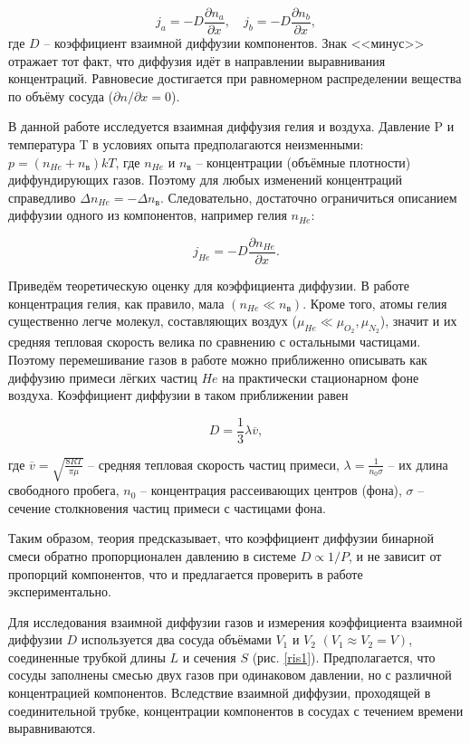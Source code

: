 \documentclass[a4paper, 12pt]{article}
\begin{document}
\[ j_a = -D\frac{\partial n_a}{\partial x}, \quad j_b = -D\frac{\partial n_b}{\partial x}, \]
где $ D $ -- коэффициент взаимной диффузии компонентов. Знак <<минус>> отражает тот факт, что диффузия идёт в направлении выравнивания концентраций. Равновесие достигается при равномерном распределении вещества по объёму сосуда ($ \partial n / \partial x = 0 $).

В данной работе исследуется взаимная диффузия гелия и воздуха. Давление P и температура T в условиях опыта предполагаются неизменными: $ p=(n_{He}+n_{\text{в}})kT $, где $ n_{He} $ и $ n_{\text{в}} $ -- концентрации (объёмные плотности) диффундирующих газов. Поэтому для любых изменений концентраций справедливо $ \Delta n_{He}=-\Delta n_{\text{в}} $. Следовательно, достаточно ограничиться описанием диффузии одного из компонентов, например гелия $ n_{He} $:

\begin{equation}\label{1}
j_{He}=-D\frac{\partial n_{He}}{\partial x}.
\end{equation}

Приведём теоретическую оценку для коэффициента диффузии. В работе концентрация гелия, как правило, мала $ (n_{He} \ll n_\text{в}) $. Кроме того, атомы гелия существенно легче молекул, составляющих воздух ($ \mu_{He} \ll \mu_{O_2}, \mu_{N_2} $), значит и их средняя тепловая скорость велика по сравнению с остальными частицами. Поэтому перемешивание газов в работе можно приближенно описывать как диффузию примеси лёгких частиц $ He $ на практически стационарном фоне воздуха. Коэффициент диффузии в таком приближении равен

\begin{equation}\label{2}
D=\frac{1}{3}\lambda \overline{v},
\end{equation}

где $ \overline{v}=\sqrt{\frac{8RT}{\pi \mu}} $ -- средняя тепловая скорость частиц примеси, $ \lambda = \frac{1}{n_0\sigma} $ -- их длина свободного пробега, $ n_0 $ -- концентрация рассеивающих центров (фона), $ \sigma $ -- сечение столкновения частиц примеси с частицами фона.

Таким образом, теория предсказывает, что коэффициент диффузии бинарной смеси обратно пропорционален давлению в системе $ D \propto 1/P $, и не зависит от пропорций компонентов, что и предлагается проверить в работе экспериментально.

Для исследования взаимной диффузии газов и измерения коэффициента взаимной диффузии $ D $ используется два сосуда объёмами $ V_1 $ и $ V_2 $ $ (V_1\approx V_2=V) $, соединенные трубкой длины $ L $ и сечения $ S $ (рис. \ref{ris1}). Предполагается, что сосуды заполнены смесью двух газов при одинаковом давлении, но с различной концентрацией компонентов. Вследствие взаимной диффузии, проходящей в соединительной трубке, концентрации компонентов в сосудах с течением времени выравниваются. 
\end{document}
